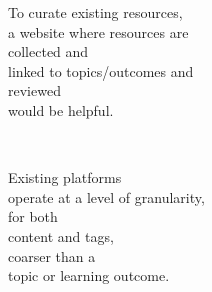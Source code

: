 \documentclass{chalkboard}
\begin{document}
\begin{frame}
  \huge
  \vfill

  To curate existing resources, \\
  \quad a website where resources are\\
  \quad\quad collected and  \\
  \quad\quad linked to topics/outcomes and \\
  \quad\quad reviewed \\
  \quad would be helpful.

  \vfill

\end{frame}

\begin{frame}[nofills]
\vfill

 \\[24pt]


\vfill
\end{frame}

%
%
\begin{frame}
\end{frame}

\begin{frame}
\end{frame}

\begin{frame}
\end{frame}

\begin{frame}
\end{frame}

\begin{frame}
\end{frame}

\clearbackgroundpicture

\begin{frame}
  \vfill

  \huge 

  Existing platforms \\
  \quad operate at a level of granularity,  \\
  \quad for both \\
  \quad\quad content and tags, \\
  \quad coarser than a \\
  \quad\quad topic or learning outcome.

  \vfill
\end{frame}
\end{document}
